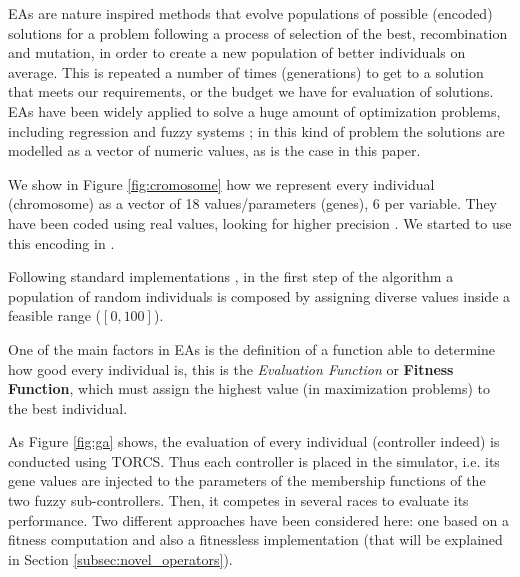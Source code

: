 \documentclass[10pt,journal,compsoc]{IEEEtran}
\begin{document}
EAs are nature inspired methods that evolve populations of possible (encoded) solutions for a problem following a process of selection of the best,
recombination and mutation, in order to create a new population of
better individuals on average. This is repeated a number of times
(generations) to get to a solution that meets our requirements, or the
budget we have for evaluation of solutions. EAs have been widely
applied to solve a huge amount of optimization problems, including regression and fuzzy systems \cite{hoffmann2001evolutionary}; in this kind of problem the solutions are modelled as a vector of numeric values, as is the
case in this paper.

We show in Figure \ref{fig:cromosome} how we represent every individual (chromosome) as a vector of 18 values/parameters (genes), 6 per variable. They have been coded using real values, looking for higher precision \cite{elsayed13}. We started to use this encoding in \cite{10.1007/978-3-319-77538-8_24}.



Following standard implementations \cite{GAs_Goldberg89}, in the first step of the algorithm \cite{salem_evo17} a population of random individuals is composed by assigning diverse values inside a feasible range ($[0,100]$).

One of the main factors in EAs is the definition of a function able to determine how good every individual is, this is the \textit{Evaluation Function} or \textbf{Fitness Function}, which must assign the highest value (in maximization problems) to the best individual.

As Figure \ref{fig:ga} shows, the evaluation of every individual (controller indeed) is conducted using TORCS. Thus each controller is placed in the simulator, i.e. its gene values are injected to the parameters of the membership functions of the two fuzzy sub-controllers. Then, it competes in several races to evaluate its performance.
Two different approaches have been considered here: one based on a fitness computation and also a fitnessless implementation (that will be explained in Section \ref{subsec:novel_operators}).
\end{document}
